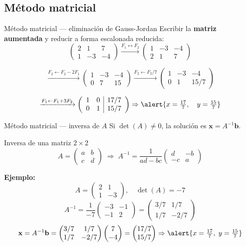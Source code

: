 \documentclass[11pt, aspectratio=169]{beamer}
\newcommand{\mat}[1]{\begin{pmatrix} #1 \end{pmatrix}}
\begin{document}
	\subsection{Método matricial}
	
	\begin{frame}{Método matricial — eliminación de Gauss-Jordan}
		Escribir la \textbf{matriz aumentada} y reducir a forma escalonada reducida:
		\[
		\left(\begin{array}{cc|c}
			2 &  1 &  7 \\
			1 & -3 & -4
		\end{array}\right)
		\xrightarrow{F_1 \leftrightarrow F_2}
		\left(\begin{array}{cc|c}
			1 & -3 & -4 \\
			2 &  1 &  7
		\end{array}\right)
		\]
		
		\pause
		\[
		\xrightarrow{F_2 \leftarrow F_2 - 2F_1}
		\left(\begin{array}{cc|c}
			1 & -3 & -4 \\
			0 &  7 & 15
		\end{array}\right)
		\xrightarrow{F_2 \leftarrow F_2/7}
		\left(\begin{array}{cc|c}
			1 & -3 & -4 \\
			0 &  1 & 15/7
		\end{array}\right)
		\]
		
		\pause
		\[
		\xrightarrow{F_1 \leftarrow F_1 + 3F_2}
		\left(\begin{array}{cc|c}
			1 & 0 & 17/7 \\
			0 & 1 & 15/7
		\end{array}\right)
		\Rightarrow
		\alert{x = \tfrac{17}{7},\quad y = \tfrac{15}{7}}
		\]
	\end{frame}
	
	\begin{frame}{Método matricial — inversa de $A$}
		Si $\det(A) \neq 0$, la solución es $\mathbf{x} = A^{-1}\mathbf{b}$.
		
		\begin{block}{Inversa de una matriz $2\times2$}
			\[
			A = \mat{a & b \\ c & d}
			\;\Rightarrow\;
			A^{-1} = \frac{1}{ad-bc}\mat{d & -b \\ -c & a}
			\]
		\end{block}
		
		\pause
		\textbf{Ejemplo:}
		\[
		A = \mat{2 & 1 \\ 1 & -3}, \quad \det(A) = -7
		\]
		\[
		A^{-1} = \frac{1}{-7}\mat{-3 & -1 \\ -1 & 2}
		= \mat{3/7 & 1/7 \\ 1/7 & -2/7}
		\]
		\pause
		\[
		\mathbf{x} = A^{-1}\mathbf{b}
		= \mat{3/7 & 1/7 \\ 1/7 & -2/7}\mat{7 \\ -4}
		= \mat{17/7 \\ 15/7}
		\Rightarrow \alert{x = \tfrac{17}{7},\; y = \tfrac{15}{7}}
		\]
	\end{frame}
	
\end{document}
